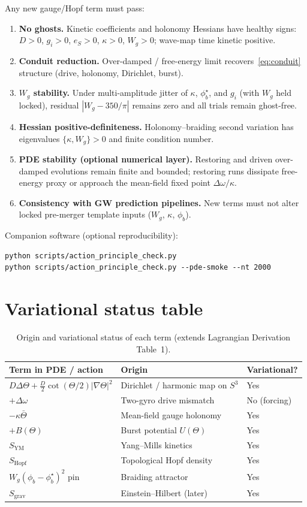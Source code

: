 \documentclass[11pt]{article}
\begin{document}
Any new gauge/Hopf term must pass:

\begin{enumerate}
\item \textbf{No ghosts.} Kinetic coefficients and holonomy Hessians have healthy signs:
  $D>0$, $g_i>0$, $e_S>0$, $\kappa>0$, $W_g>0$; wave-map time kinetic positive.
\item \textbf{Conduit reduction.} Over-damped / free-energy limit recovers~\eqref{eq:conduit}
  structure (drive, holonomy, Dirichlet, burst).
\item \textbf{$W_g$ stability.} Under multi-amplitude jitter of $\kappa$, $\phi_b^\star$, and $g_i$
  (with $W_g$ held locked), residual $|W_g-350/\pi|$ remains zero and all trials remain ghost-free.
\item \textbf{Hessian positive-definiteness.} Holonomy--braiding second variation has eigenvalues
  $\{\kappa,W_g\}>0$ and finite condition number.
\item \textbf{PDE stability (optional numerical layer).} Restoring and driven over-damped
  evolutions remain finite and bounded; restoring runs dissipate free-energy proxy or
  approach the mean-field fixed point $\Delta\omega/\kappa$.
\item \textbf{Consistency with GW prediction pipelines.} New terms must not alter
  locked pre-merger template inputs ($W_g$, $\kappa$, $\phi_b$).
\end{enumerate}

Companion software (optional reproducibility):
\begin{verbatim}
python scripts/action_principle_check.py
python scripts/action_principle_check.py --pde-smoke --nt 2000
\end{verbatim}

\section{Variational status table}

\begin{table}[h]
\centering
\begin{tabular}{@{}lll@{}}
\hline
Term in PDE / action & Origin & Variational? \\
\hline
$D\Delta\Theta+\tfrac{D}{2}\cot(\Theta/2)|\nabla\Theta|^2$
  & Dirichlet / harmonic map on $S^3$ & Yes \\
$+\Delta\omega$ & Two-gyro drive mismatch & No (forcing) \\
$-\kappa\bar\Theta$ & Mean-field gauge holonomy & Yes \\
$+B(\Theta)$ & Burst potential $U(\Theta)$ & Yes \\
$S_{\mathrm{YM}}$ & Yang--Mills kinetics & Yes \\
$S_{\mathrm{Hopf}}$ & Topological Hopf density & Yes \\
$W_g(\phi_b-\phi_b^\star)^2$ pin & Braiding attractor & Yes \\
$S_{\mathrm{grav}}$ & Einstein--Hilbert (later) & Yes \\
\hline
\end{tabular}
\caption{Origin and variational status of each term (extends Lagrangian Derivation Table~1).}
\end{table}
\end{document}
